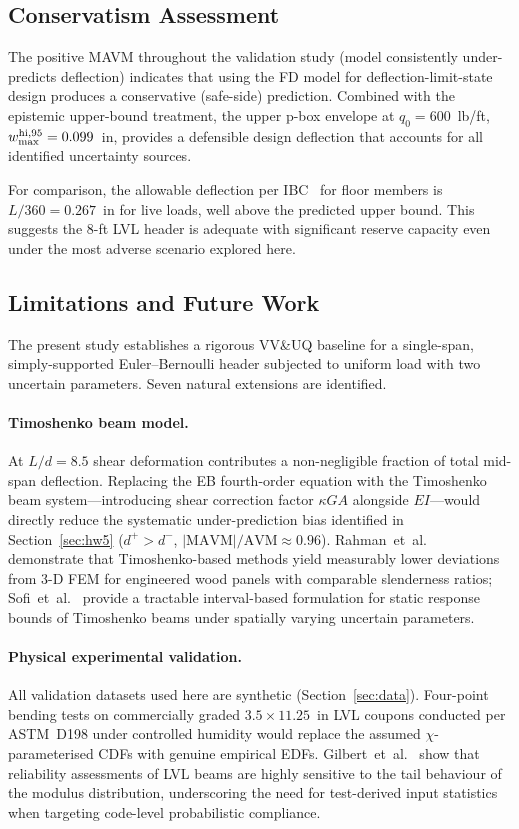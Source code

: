 \documentclass[10pt,twocolumn]{article}
\begin{document}
\subsection{Conservatism Assessment}
\label{sec:cons}

The positive MAVM throughout the validation study (model consistently
under-predicts deflection) indicates that using the FD model for
deflection-limit-state design produces a conservative (safe-side) prediction.
Combined with the epistemic upper-bound treatment, the upper p-box
envelope at $q_0=600$~lb/ft, $w_{\rm max}^{\rm hi,95} = 0.099$~in,
provides a defensible design deflection that accounts for all
identified uncertainty sources.

For comparison, the allowable deflection per IBC~\cite{ibc2021} for
floor members is $L/360 = 0.267$~in for live loads, well above the
predicted upper bound.
This suggests the 8-ft LVL header is adequate with significant reserve
capacity even under the most adverse scenario explored here.

\subsection{Limitations and Future Work}
\label{sec:future}

The present study establishes a rigorous VV\&UQ baseline for a
single-span, simply-supported Euler--Bernoulli header subjected to
uniform load with two uncertain parameters.
Seven natural extensions are identified.

\paragraph{Timoshenko beam model.}
At $L/d = 8.5$ shear deformation contributes a non-negligible fraction
of total mid-span deflection.
Replacing the EB fourth-order equation with the Timoshenko beam
system---introducing shear correction factor $\kappa GA$ alongside
$EI$---would directly reduce the systematic under-prediction bias
identified in Section~\ref{sec:hw5} ($d^+ > d^-$,
$|\mathrm{MAVM}|/\mathrm{AVM} \approx 0.96$).
Rahman~et~al.~\cite{rahman2020} demonstrate that Timoshenko-based
methods yield measurably lower deviations from 3-D FEM for engineered
wood panels with comparable slenderness ratios; Sofi~et~al.~\cite{sofi2015}
provide a tractable interval-based formulation for static response
bounds of Timoshenko beams under spatially varying uncertain parameters.

\paragraph{Physical experimental validation.}
All validation datasets used here are synthetic
(Section~\ref{sec:data}).
Four-point bending tests on commercially graded
$3.5 \times 11.25$~in LVL coupons conducted per ASTM~D198 under
controlled humidity would replace the assumed $\chi$-parameterised CDFs
with genuine empirical EDFs.
Gilbert~et~al.~\cite{gilbert2019} show that reliability assessments of
LVL beams are highly sensitive to the tail behaviour of the modulus
distribution, underscoring the need for test-derived input statistics
when targeting code-level probabilistic compliance.
\end{document}

